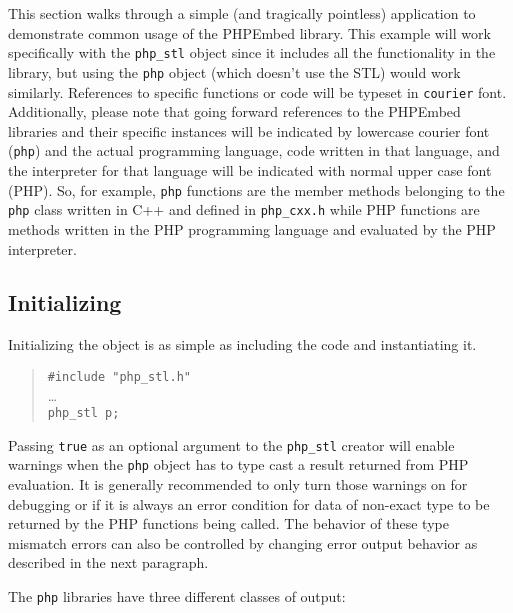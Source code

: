 \documentclass[11pt,titlepage]{article}
\begin{document}
This section walks through a simple (and tragically pointless) application to demonstrate common usage of the PHPEmbed library. This example will work specifically with the \verb|php_stl| object since it includes all the functionality in the library, but using the \verb|php| object (which doesn't use the STL) would work similarly. References to specific functions or code will be typeset in \verb|courier| font. Additionally, please note that going forward references to the PHPEmbed libraries and their specific instances will be indicated by lowercase courier font (\verb|php|) and the actual programming language, code written in that language, and the interpreter for that language will be indicated with normal upper case font (PHP). So, for example, \verb|php| functions are the member methods belonging to the \verb|php| class written in C++ and defined in \verb|php_cxx.h| while PHP functions are methods written in the PHP programming language and evaluated by the PHP interpreter.

\subsection{Initializing}

Initializing the object is as simple as including the code and instantiating it. 

\begin{quote}
\verb|#include "php_stl.h"|\\
\ldots\\
\verb|php_stl p;|
\end{quote}

Passing \verb|true| as an optional argument to the \verb|php_stl| creator will enable warnings when the \verb|php| object has to type cast a result returned from PHP evaluation. It is generally recommended to only turn those warnings on for debugging or if it is always an error condition for data of non-exact type to be returned by the PHP functions being called. The behavior of these type mismatch errors can also be controlled by changing error output behavior as described in the next paragraph. 

The \verb|php| libraries have three different classes of output:
\end{document}
